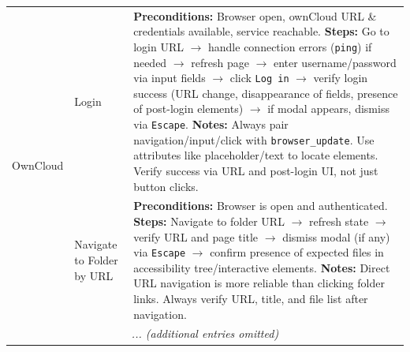 \begin{table}[htbp]
\begin{tabular}{l|p{2cm}|p{8cm}}
\multirow{2}{*}{OwnCloud} 
& Login & 
\textbf{Preconditions:} Browser open, ownCloud URL \& credentials available, service reachable.  
\textbf{Steps:} Go to login URL $\rightarrow$ handle connection errors (\texttt{ping}) if needed $\rightarrow$ refresh page $\rightarrow$ enter username/password via input fields $\rightarrow$ click \texttt{Log in} $\rightarrow$ verify login success (URL change, disappearance of fields, presence of post-login elements) $\rightarrow$ if modal appears, dismiss via \texttt{Escape}.  
\textbf{Notes:} Always pair navigation/input/click with \texttt{browser\_update}. Use attributes like placeholder/text to locate elements. Verify success via URL and post-login UI, not just button clicks. \\

& Navigate to Folder by URL & 
\textbf{Preconditions:} Browser is open and authenticated.  
\textbf{Steps:} Navigate to folder URL $\rightarrow$ refresh state $\rightarrow$ verify URL and page title $\rightarrow$ dismiss modal (if any) via \texttt{Escape} $\rightarrow$ confirm presence of expected files in accessibility tree/interactive elements.  
\textbf{Notes:} Direct URL navigation is more reliable than clicking folder links. Always verify URL, title, and file list after navigation. \\
\midrule
\multicolumn{3}{c}{\textit{... (additional entries omitted)}} \\
\bottomrule
\end{tabular}
\end{table}


